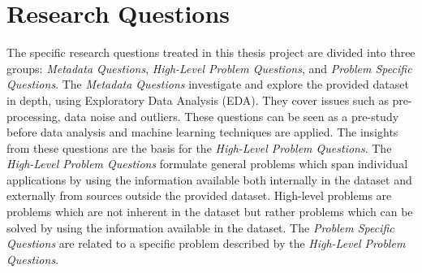 \section{Research Questions}
\label{sec:research-questions}
The specific research questions treated in this thesis project are divided into three groups: \textit{Metadata Questions}, \textit{High-Level Problem Questions}, and \textit{Problem Specific Questions}.
The \textit{Metadata Questions} investigate and explore the provided dataset in depth, using Exploratory Data Analysis (EDA).
They cover issues such as pre-processing, data noise and outliers.
These questions can be seen as a pre-study before data analysis and machine learning techniques are applied.
The insights from these questions are the basis for the \textit{High-Level Problem Questions}.
The \textit{High-Level Problem Questions} formulate general problems which span individual applications by using the information available both internally in the dataset and externally from sources outside the provided dataset.
High-level problems are problems which are not inherent in the dataset but rather problems which can be solved by using the information available in the dataset.
The \textit{Problem Specific Questions} are related to a specific problem described by the \textit{High-Level Problem Questions}.

